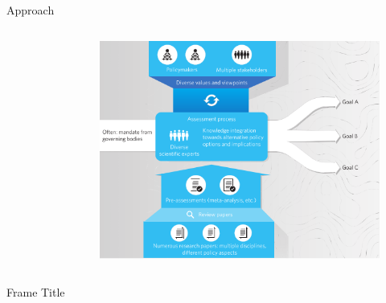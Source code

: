 \documentclass[9pt]{beamer}
\begin{document}
\begin{frame}{Approach}
\begin{columns}
\begin{column}{0.5\linewidth}
\begin{figure}
	\end{figure}
	
	\end{column}
	\begin{column}{0.5\linewidth}
		\begin{center}
			\begin{figure}
				\includegraphics[width=0.85\linewidth]{images/pyramid.png}
			\end{figure}
		\end{center}
	\end{column}
\end{columns}

\end{frame}



\begin{frame}{Frame Title}
	\small
	
\end{frame}
\end{document}
